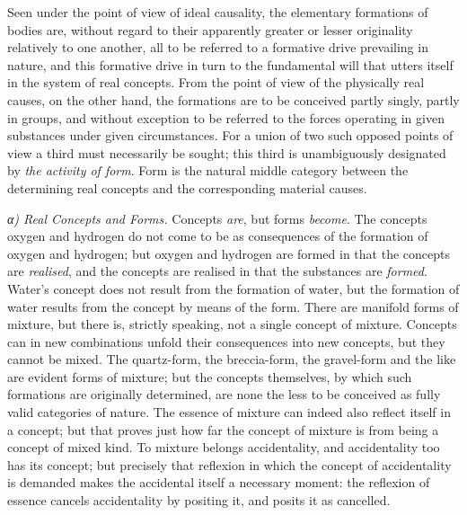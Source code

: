 \documentclass[12pt,a4paper]{book}
\newcommand{\subrunin}[1]{\emph{#1}\hspace{0.4em}}
\begin{document}
Seen under the point of view of ideal causality, the elementary formations of bodies are, without regard to their
apparently greater or lesser originality relatively to one another, all to be referred to a formative drive prevailing in
nature, and this formative drive in turn to the fundamental will that utters itself in the system of real concepts. From
the point of view of the physically real causes, on the other hand, the formations are to be conceived partly singly,
partly in groups, and without exception to be referred to the forces operating in given substances under given
circumstances. For a union of two such opposed points of view a third must necessarily be sought; this third is
unambiguously designated by \emph{the activity of form}. Form is the natural middle category between the determining real
concepts and the corresponding material causes.

\subrunin{α) Real Concepts and Forms.} Concepts \emph{are},
but forms \emph{become}. The concepts oxygen and hydrogen do not come to be as consequences of the formation of oxygen
and hydrogen; but oxygen and hydrogen are formed in that the concepts are \emph{realised}, and the concepts are realised
in that the substances are \emph{formed}. Water's concept does not result from the formation of water, but the formation
of water results from the concept by means of the form. There are manifold forms of mixture, but there is, strictly
speaking, not a single concept of mixture. Concepts can in new combinations unfold their consequences into new concepts,
but they cannot be mixed. The quartz-form, the breccia-form, the gravel-form and the like are evident forms of mixture;
but the concepts themselves, by which such formations are originally determined, are none the less to be conceived as
fully valid categories of nature. The essence of mixture can indeed also reflect itself in a concept; but that proves
just how far the concept of mixture is from being a concept of mixed kind. To mixture belongs accidentality, and
accidentality too has its concept; but precisely that reflexion in which the concept of accidentality is demanded makes
the accidental itself a necessary moment: the reflexion of essence cancels accidentality by positing it, and posits it as
cancelled.
\end{document}
